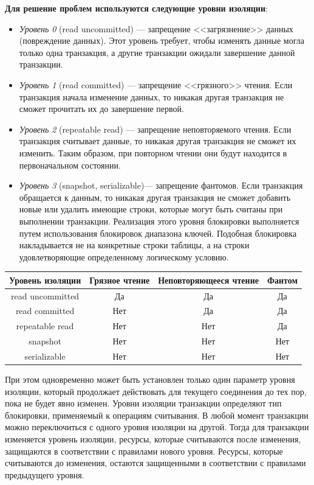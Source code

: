 \textbf{Для решение проблем используются следующие уровни изоляции}:
\begin{itemize}
	\item \textit{Уровень 0} (read uncommitted) --- запрещение <<загрязнение>> данных (повреждение данных). Этот уровень требует, чтобы изменять данные могла только одна транзакция, а другие транзакции ожидали завершение данной транзакции.
	\item \textit{Уровень 1} (read committed) --- запрещение <<грязного>> чтения. Если транзакция начала изменение данных, то никакая другая транзакция не сможет прочитать их до завершение первой.
	\item \textit{Уровень 2} (repeatable read) --- запрещение неповторяемого чтения. Если транзакция считывает данные, то никакая другая транзакция не сможет их изменить. Таким образом, при повторном чтении они будут находится в первоначальном состоянии.
	\item \textit{Уровень 3} (snapshot, serializable)--- запрещение фантомов. Если транзакция обращается к данным, то никакая другая транзакция не сможет добавить новые или удалить имеющие строки, которые могут быть считаны при выполнении транзакции. Реализация этого уровня блокировки выполняется путем использования блокировок диапазона ключей. Подобная блокировка накладывается не на конкретные строки таблицы, а на строки удовлетворяющие определенному логическому условию.
\end{itemize}
\begin{table}[ht!]
	\begin{center}
		\label{tbl:lvl_izo}
		\begin{tabular}{|c|c|c|c|}
			\hline
			Уровень изоляции & Грязное чтение & Неповторяющееся чтение & Фантом \\
			\hline
			read uncommitted & Да & Да & Да\\
			\hline
			read committed & Нет & Да & Да\\
			\hline
			repeatable read & Нет & Нет & Да\\
			\hline
			snapshot & Нет & Нет & Нет\\
			\hline
			serializable & Нет & Нет & Нет\\
			\hline
		\end{tabular}
	\end{center}
\end{table}


При этом одновременно может быть установлен только один параметр уровня изоляции, который продолжает действовать для текущего соединения до тех пор, пока не будет явно изменен.
Уровни изоляции транзакции определяют тип блокировки, применяемый к операциям считывания.
В любой момент транзакции можно переключиться с одного уровня изоляции на другой.
Тогда для транзакции изменяется уровень изоляции, ресурсы, которые считываются после изменения, защищаются в соответствии с правилами нового уровня. Ресурсы, которые считываются до изменения, остаются защищенными в соответствии с правилами предыдущего уровня.


